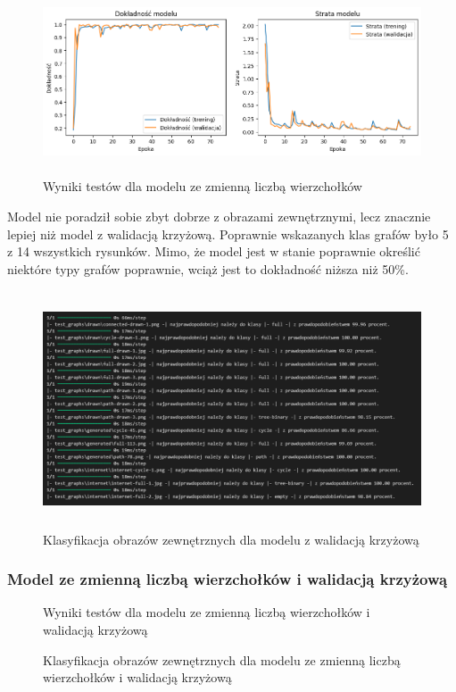 \begin{figure}[ht]
	\centering
	\includegraphics[height=5.5cm]{partials/tests/images/v2_multiple_edges_epoch75.png}
	\caption{Wyniki testów dla modelu ze zmienną liczbą wierzchołków}
	\label{Fig:tests-var-1}
\end{figure}
\FloatBarrier

Model nie poradził sobie zbyt dobrze z obrazami zewnętrznymi, lecz znacznie lepiej niż model z walidacją krzyżową.
Poprawnie wskazanych klas grafów było 5 z 14 wszystkich rysunków.
Mimo, że model jest w stanie poprawnie określić niektóre typy grafów poprawnie,
wciąż jest to dokładność niższa niż 50\%.

\begin{figure}[ht]
	\centering
	\includegraphics[height=7cm]{partials/tests/images/v2_multiple_edges_epoch75_img_tests.png}
	\caption{Klasyfikacja obrazów zewnętrznych dla modelu z walidacją krzyżową}
	\label{Fig:tests-var-2}
\end{figure}
\FloatBarrier

\subsubsection{Model ze zmienną liczbą wierzchołków i walidacją krzyżową}

\begin{figure}[ht]
	\centering
	\caption{Wyniki testów dla modelu ze zmienną liczbą wierzchołków i walidacją krzyżową}
	\label{Fig:tests-csvar-1}
\end{figure}
\FloatBarrier

\begin{figure}[ht]
	\centering
	\caption{Klasyfikacja obrazów zewnętrznych dla modelu ze zmienną liczbą wierzchołków i walidacją krzyżową}
	\label{Fig:tests-csvar-2}
\end{figure}
\FloatBarrier